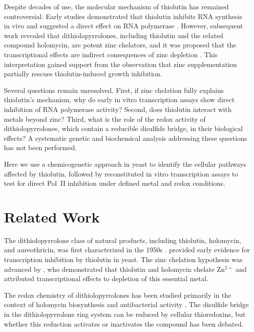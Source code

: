 \documentclass[11pt]{article}
\begin{document}
Despite decades of use, the molecular mechanism of thiolutin has remained controversial. Early studies demonstrated that thiolutin inhibits RNA synthesis in vivo and suggested a direct effect on RNA polymerase \citep{tipper1973}. However, subsequent work revealed that dithiolopyrrolones, including thiolutin and the related compound holomycin, are potent zinc chelators, and it was proposed that the transcriptional effects are indirect consequences of zinc depletion \citep{lauber2009}. This interpretation gained support from the observation that zinc supplementation partially rescues thiolutin-induced growth inhibition.

Several questions remain unresolved. First, if zinc chelation fully explains thiolutin's mechanism, why do early in vitro transcription assays show direct inhibition of RNA polymerase activity? Second, does thiolutin interact with metals beyond zinc? Third, what is the role of the redox activity of dithiolopyrrolones, which contain a reducible disulfide bridge, in their biological effects? A systematic genetic and biochemical analysis addressing these questions has not been performed.

Here we use a chemicogenetic approach in yeast to identify the cellular pathways affected by thiolutin, followed by reconstituted in vitro transcription assays to test for direct Pol~II inhibition under defined metal and redox conditions.

\section{Related Work}

The dithiolopyrrolone class of natural products, including thiolutin, holomycin, and aureothricin, was first characterized in the 1950s \citep{celmer1952}. \citet{tipper1973} provided early evidence for transcription inhibition by thiolutin in yeast. The zinc chelation hypothesis was advanced by \citet{lauber2009}, who demonstrated that thiolutin and holomycin chelate Zn$^{2+}$ and attributed transcriptional effects to depletion of this essential metal.

The redox chemistry of dithiolopyrrolones has been studied primarily in the context of holomycin biosynthesis and antibacterial activity \citep{li2010holo,duo2018}. The disulfide bridge in the dithiolopyrrolone ring system can be reduced by cellular thioredoxins, but whether this reduction activates or inactivates the compound has been debated.
\end{document}
